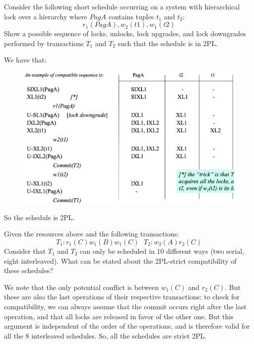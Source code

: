 \documentclass[12pt, a4paper]{report}
\newtheorem[style=M,bodystyle=\normalfont]{theorem}{Theorem}
\newtheorem[style=M,bodystyle=\normalfont]{corollary}{Corollary}
\newtheorem[style=M,bodystyle=\normalfont]{lemma}{Lemma}
\newtheorem[style=M,bodystyle=\normalfont]{definition}{Definition}
\begin{document}
\begin{Exercise}[label=20]
    Consider the following short schedule occurring on a system with hierarchical lock over a hierarchy where $PagA$ contains tuples 
    $t_1$ and $t_2$:
    \[r_1( PagA ), w_2( t1 ), w_1( t2 )\]
    Show a possible sequence of locks, unlocks, lock upgrades, and lock downgrades performed by transactions $T_1$ and $T_2$ such that
    the schedule is in 2PL.
\end{Exercise}
\begin{Answer}[ref=20]
    We have that: 
    \begin{figure}[H]
        \centering
        \includegraphics[width=1\linewidth]{images/HLsol1.png}
    \end{figure}
    So the schedule is 2PL.
\end{Answer}

\newpage

\begin{Exercise}[label=21]
    Given the resources above and the following transactions:
    \[T_1: r_1(C) w_1(B) w_1(C) \:\:\: T_2: w_2(A) r_2(C)\]
    Consider that $T_1$ and $T_2$ can only be scheduled in 10 different ways (two serial, eight interleaved). What can be stated about 
    the 2PL-strict compatibility of these schedules? 
\end{Exercise}
\begin{Answer}[ref=21]
    We note that the only potential conflict is between $w_1(C)$ and $r_2(C)$. But these are also the last operations of their respective 
    transactions: to check for compatibility, we can always assume that the commit occurs right after the last operation, and that all 
    locks are released in favor of the other one. But this argument is independent of the order of the operations, and is therefore valid 
    for all the 8 interleaved schedules. So, all the schedules are strict 2PL. 
\end{Answer}
\end{document}

